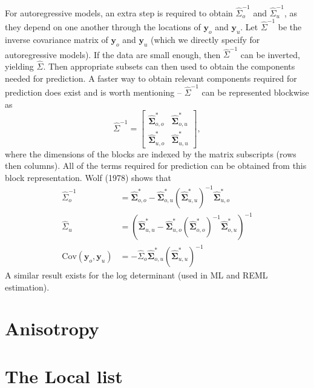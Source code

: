 \documentclass{article}
\begin{document}
For autoregressive models, an extra step is required to obtain
\(\hat{\Sigma}^{-1}_o\) and \(\hat{\Sigma}^{-1}_u\), as they depend on
one another through the locations of \(\mathbf{y}_o\) and
\(\mathbf{y}_u\). Let \(\hat{\Sigma}^{-1}\) be the inverse covariance
matrix of \(\mathbf{y}_o\) and \(\mathbf{y}_u\) (which we directly
specify for autoregressive models). If the data are small enough, then
\(\hat{\Sigma}^{-1}\) can be inverted, yielding \(\hat{\Sigma}\). Then
appropriate subsets can then used to obtain the components needed for
prediction. A faster way to obtain relevant components required for
prediction does exist and is worth mentioning -- \(\hat{\Sigma}^{-1}\)
can be represented blockwise as \begin{equation}\label{eq:auto_hw}
  \hat{\Sigma}^{-1} =
  \begin{bmatrix}
    \mathbf{\hat{\Sigma}}^{*}_{o, o} & \mathbf{\hat{\Sigma}}^{*}_{o, u} \\
    \mathbf{\hat{\Sigma}}^{*}_{u, o} & \mathbf{\hat{\Sigma}}^{*}_{u, u}
  \end{bmatrix},
\end{equation} where the dimensions of the blocks are indexed by the
matrix subscripts (rows then columns). All of the terms required for
prediction can be obtained from this block representation. Wolf (1978)
shows that \begin{equation}\label{eq:hw_forms}
  \begin{split}
    \hat{\Sigma}^{-1}_o & = \mathbf{\hat{\Sigma}}^{*}_{o, o} - \mathbf{\hat{\Sigma}}^{*}_{o, u} (\mathbf{\hat{\Sigma}}^{*}_{u, u})^{-1} \mathbf{\hat{\Sigma}}^{*}_{u, o} \\
    \hat{\Sigma}_u & = (\mathbf{\hat{\Sigma}}^{*}_{u, u} - \mathbf{\hat{\Sigma}}^{*}_{u, o} (\mathbf{\hat{\Sigma}}^{*}_{o, o})^{-1} \mathbf{\hat{\Sigma}}^{*}_{o, u})^{-1} \\
    \text{Cov}(\mathbf{y}_o, \mathbf{y}_u) & = - \hat{\Sigma}_o \mathbf{\hat{\Sigma}}^{*}_{o, u} (\mathbf{\hat{\Sigma}}^{*}_{u, u})^{-1}
  \end{split}
\end{equation} A similar result exists for the log determinant (used in
ML and REML estimation).

\hypertarget{anisotropy}{%
\section{Anisotropy}\label{anisotropy}}

\hypertarget{the-local-list}{%
\section{The Local list}\label{the-local-list}}
\end{document}
